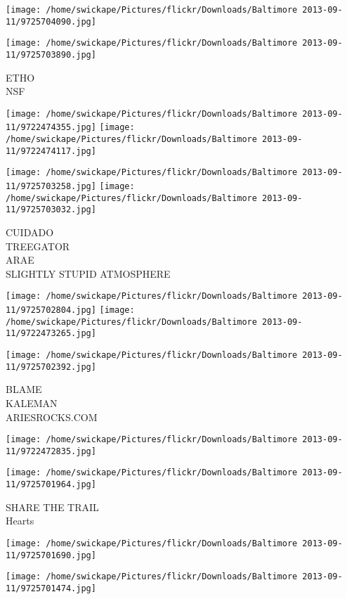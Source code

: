 \documentclass[10pt,letterpaper]{article}
\begin{document}
\texttt{[image: /home/swickape/Pictures/flickr/Downloads/Baltimore 2013-09-11/9725704090.jpg]}

\vspace{0.25in}
\texttt{[image: /home/swickape/Pictures/flickr/Downloads/Baltimore 2013-09-11/9725703890.jpg]}

ETHO\\
NSF
\pagebreak

\texttt{[image: /home/swickape/Pictures/flickr/Downloads/Baltimore 2013-09-11/9722474355.jpg]}
\texttt{[image: /home/swickape/Pictures/flickr/Downloads/Baltimore 2013-09-11/9722474117.jpg]}

\texttt{[image: /home/swickape/Pictures/flickr/Downloads/Baltimore 2013-09-11/9725703258.jpg]}
\texttt{[image: /home/swickape/Pictures/flickr/Downloads/Baltimore 2013-09-11/9725703032.jpg]}

CUIDADO\\
TREEGATOR\\
ARAE\\
SLIGHTLY STUPID ATMOSPHERE
\pagebreak

\texttt{[image: /home/swickape/Pictures/flickr/Downloads/Baltimore 2013-09-11/9725702804.jpg]}
\texttt{[image: /home/swickape/Pictures/flickr/Downloads/Baltimore 2013-09-11/9722473265.jpg]}

\vspace{0.25in}
\texttt{[image: /home/swickape/Pictures/flickr/Downloads/Baltimore 2013-09-11/9725702392.jpg]}

BLAME\\
KALEMAN\\
ARIESROCKS.COM
\pagebreak

\texttt{[image: /home/swickape/Pictures/flickr/Downloads/Baltimore 2013-09-11/9722472835.jpg]}

\vspace{0.25in}
\texttt{[image: /home/swickape/Pictures/flickr/Downloads/Baltimore 2013-09-11/9725701964.jpg]}

SHARE THE TRAIL\\
Hearts
\pagebreak

\texttt{[image: /home/swickape/Pictures/flickr/Downloads/Baltimore 2013-09-11/9725701690.jpg]}

\vspace{0.25in}
\texttt{[image: /home/swickape/Pictures/flickr/Downloads/Baltimore 2013-09-11/9725701474.jpg]}
\end{document}
